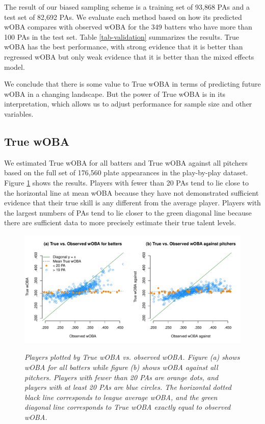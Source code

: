 \documentclass[11pt]{article}
\begin{document}
The result of our biased sampling scheme is a training set of 93,868 PAs and a
test set of 82,692 PAs. We evaluate each method based on how its predicted wOBA
compares with observed wOBA for the 349 batters who have more than 100 PAs in
the test set. Table \ref{tab-validation} summarizes the results. True wOBA has
the best performance, with strong evidence that it is better than regressed
wOBA but only weak evidence that it is better than the mixed effects model.

We conclude that there is some value to True wOBA in terms of predicting
future wOBA in a changing landscape. But the power of True wOBA is in its
interpretation, which allows us to adjust performance for sample size and other
variables.


\subsection{True wOBA}

We estimated True wOBA for all batters and True wOBA against all pitchers based
on the full set of 176,560 plate appearances in the play-by-play dataset.
Figure \ref{fig-true-woba} shows the results. Players with fewer than 20 PAs
tend to lie close to the horizontal line at mean wOBA because they have not
demonstrated sufficient evidence that their true skill is any different from
the average player. Players with the largest numbers of PAs tend to lie closer
to the green diagonal line because there are sufficient data to more precisely
estimate their true talent levels.

\begin{figure}[h]
\centering
\caption{\it Players plotted by True wOBA vs. observed wOBA. Figure (a) shows
    wOBA for all batters while figure (b) shows wOBA against all pitchers.
    Players with fewer than 20 PAs are orange dots, and players with at least 20
    PAs are blue circles. The horizontal dotted black line corresponds to
    league average wOBA, and the green diagonal line corresponds to True wOBA
    exactly equal to observed wOBA.}
\includegraphics[width = .8\textwidth]{../figs/true-woba.pdf}
\label{fig-true-woba}
\end{figure}
\end{document}
